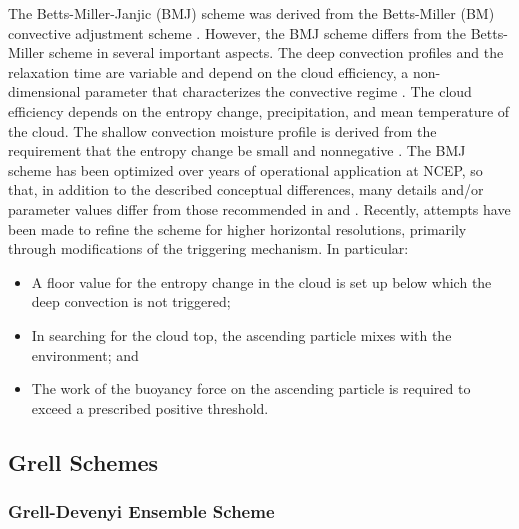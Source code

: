 The Betts-Miller-Janjic (BMJ) scheme  \citep{janjic94,janjic00} 
was derived from the Betts-Miller (BM) convective adjustment scheme 
\citep{betts86,bettsmiller86}.  However, the BMJ scheme differs 
from the Betts-Miller scheme in several important aspects. The deep convection 
profiles and the relaxation time are variable and depend on the cloud 
efficiency, a non-dimensional parameter that characterizes the convective 
regime \citep{janjic94}. The cloud efficiency depends on the entropy change, 
precipitation, and mean temperature of the cloud. The shallow convection 
moisture profile is derived from the requirement that the entropy change be 
small and nonnegative \citep{janjic94}.  The BMJ scheme has been optimized 
over years of operational application at NCEP,
so that, in addition to the described conceptual 
differences, many details and/or parameter values differ from those 
recommended in \citet{betts86} and \citet{bettsmiller86}.  Recently, attempts 
have been made to refine the scheme for higher horizontal resolutions, 
primarily through modifications of the triggering mechanism.  In particular:
 
\begin{itemize}\setlength{\parskip}{-4pt}
\item
A floor value for the entropy change in the cloud is set up below which the 
deep convection is not triggered;
\item
In searching for the cloud top, the ascending particle mixes with the environment; and
\item
The work of the buoyancy force on the ascending particle is required to exceed 
a prescribed positive threshold.
\end{itemize}

\subsection{Grell Schemes}

\subsubsection{Grell-Devenyi Ensemble Scheme}

